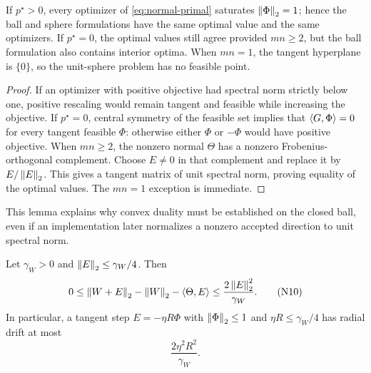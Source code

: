 \begin{lemma}
\label{lem:ball-sphere}
If \(p^\star>0\), every optimizer of \eqref{eq:normal-primal} saturates
\(\left\lVert \Phi\right\rVert_{2}=1\); hence the ball and sphere formulations have the same
optimal value and the same optimizers.  If \(p^\star=0\), the optimal values
still agree provided \(mn\ge2\), but the ball formulation also contains
interior optima.  When \(mn=1\), the tangent hyperplane is \(\{0\}\), so the
unit-sphere problem has no feasible point.
\end{lemma}

\begin{proof}
If an optimizer with positive objective had spectral norm strictly below one,
positive rescaling would remain tangent and feasible while increasing the
objective.  If \(p^\star=0\), central symmetry of the feasible set implies
that \(\left\langle G,\Phi\right\rangle=0\) for every tangent feasible \(\Phi\): otherwise either
\(\Phi\) or \(-\Phi\) would have positive objective.  When \(mn\ge2\), the
nonzero normal \(\Theta\) has a nonzero Frobenius-orthogonal complement.
Choose \(E\ne0\) in that complement and replace it by
\(E/\left\lVert E\right\rVert_{2}\).  This gives a tangent matrix of unit spectral norm, proving
equality of the optimal values.  The \(mn=1\) exception is immediate.
\end{proof}

This lemma explains why convex duality must be established on the closed ball,
even if an implementation later normalizes a nonzero accepted direction to
unit spectral norm.

\begin{lemma}
\label{lem:normal-remainder}
Let \(\gamma_W>0\) and \(\left\lVert E\right\rVert_{2}\le\gamma_W/4\).  Then
\begin{equation}
 0
 \le
 \left\lVert W+E\right\rVert_{2}-\left\lVert W\right\rVert_{2}-\left\langle \Theta,E\right\rangle
 \le
 \frac{2\left\lVert E\right\rVert_{2}^2}{\gamma_W}.
\tag{N10}
\label{eq:normal-remainder}
\end{equation}
In particular, a tangent step \(E=-\eta R\Phi\) with
\(\left\lVert \Phi\right\rVert_{2}\le1\) and \(\eta R\le\gamma_W/4\) has radial drift at most
\begin{equation}
 \frac{2\eta^2R^2}{\gamma_W}.
\tag{N11}
\label{eq:linearization-drift}
\end{equation}
\end{lemma}

